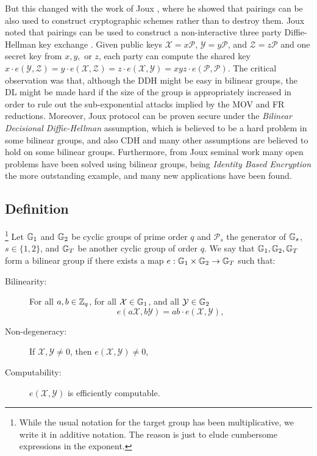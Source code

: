 But this changed with the work of Joux \cite{ANTS:Joux00}, where he showed that pairings can be also used to construct cryptographic schemes rather than to destroy them. Joux noted that pairings can be used to construct a non-interactive three party Diffie-Hellman key exchange \cite{ANTS:Joux00}. Given public keys $\mathcal{X}=x\mathcal{P}$, $\mathcal{Y}=y\mathcal{P}$, and $\mathcal{Z}=z\mathcal{P}$ and one secret key from $x,y,$ or $z$, each party can compute the shared key $x\cdot e(\mathcal{Y},\mathcal{Z})= y\cdot e(\mathcal{X},\mathcal{Z})= z\cdot e(\mathcal{X},\mathcal{Y})=xyz\cdot e(\mathcal{P},\mathcal{P})$. The critical observation was that, although the DDH might be easy in bilinear groups, the DL might be made hard if the size of the group is appropriately increased in order to rule out the sub-exponential attacks implied by the MOV and FR reductions. Moreover, Joux protocol can be proven secure under the \emph{Bilinear Decisional Diffie-Hellman} assumption, which is believed to be a hard problem in some bilinear groups, and also CDH and many other assumptions are believed to hold on some bilinear groups. Furthermore, from Joux seminal work many open problems have been solved using bilinear groups, being \emph{Identity Based Encryption} \cite{C:BonFra01} the more outstanding example, and many new applications have been found. 

\subsection{Definition}

\begin{definition} \footnote{While the usual notation for the target group has been multiplicative, we write it in additive notation. The reason is just to elude cumbersome expressions in the exponent.}
Let $\mathbb{G}_1$ and $\mathbb{G}_2$ be cyclic groups of prime order $q$ and $\mathcal{P}_s$ the generator of $\mathbb{G}_s$, $s\in\{1,2\}$, and $\mathbb{G}_T$ be another cyclic group of order $q$. We say that $\mathbb{G}_1,\mathbb{G}_2,\mathbb{G}_T$ form a bilinear group if there exists a map $e:\mathbb{G}_1\times\mathbb{G}_2\to\mathbb{G}_T$ such that:
\begin{description}
\item[Bilinearity:] For all $a,b\in\mathbb{Z}_q$, for all $\mathcal{X}\in\mathbb{G}_1$, and all $\mathcal{Y}\in\mathbb{G}_2$
$$
e(a\mathcal{X},b\mathcal{Y})=ab\cdot e(\mathcal{X},\mathcal{Y}),
$$
\item[Non-degeneracy:] If $\mathcal{X},\mathcal{Y}\neq0$, then $e(\mathcal{X},\mathcal{Y})\neq 0$,
\item[Computability:] $e(\mathcal{X},\mathcal{Y})$ is efficiently computable.
\end{description} 
\end{definition} 

